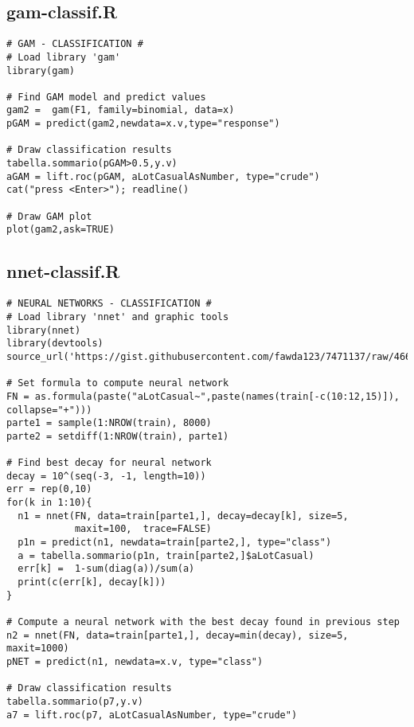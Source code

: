 \subsection{gam-classif.R}\label{sec:script-gam-classif}
\begin{verbatim}
# GAM - CLASSIFICATION #
# Load library 'gam'
library(gam)

# Find GAM model and predict values
gam2 =  gam(F1, family=binomial, data=x)
pGAM = predict(gam2,newdata=x.v,type="response")

# Draw classification results
tabella.sommario(pGAM>0.5,y.v)
aGAM = lift.roc(pGAM, aLotCasualAsNumber, type="crude")
cat("press <Enter>"); readline()

# Draw GAM plot
plot(gam2,ask=TRUE)
\end{verbatim}

\subsection{nnet-classif.R}\label{sec:script-nnet-classif}
\begin{verbatim}
# NEURAL NETWORKS - CLASSIFICATION #
# Load library 'nnet' and graphic tools
library(nnet)
library(devtools)
source_url('https://gist.githubusercontent.com/fawda123/7471137/raw/466c1474d0a505ff044412703516c34f1a4684a5/nnet_plot_update.r')

# Set formula to compute neural network
FN = as.formula(paste("aLotCasual~",paste(names(train[-c(10:12,15)]), collapse="+")))
parte1 = sample(1:NROW(train), 8000) 
parte2 = setdiff(1:NROW(train), parte1)

# Find best decay for neural network
decay = 10^(seq(-3, -1, length=10))
err = rep(0,10)
for(k in 1:10){
  n1 = nnet(FN, data=train[parte1,], decay=decay[k], size=5,
            maxit=100,  trace=FALSE)
  p1n = predict(n1, newdata=train[parte2,], type="class")
  a = tabella.sommario(p1n, train[parte2,]$aLotCasual)
  err[k] =  1-sum(diag(a))/sum(a)
  print(c(err[k], decay[k]))
}

# Compute a neural network with the best decay found in previous step
n2 = nnet(FN, data=train[parte1,], decay=min(decay), size=5,  maxit=1000)
pNET = predict(n1, newdata=x.v, type="class")

# Draw classification results
tabella.sommario(p7,y.v)
a7 = lift.roc(p7, aLotCasualAsNumber, type="crude")
\end{verbatim}

